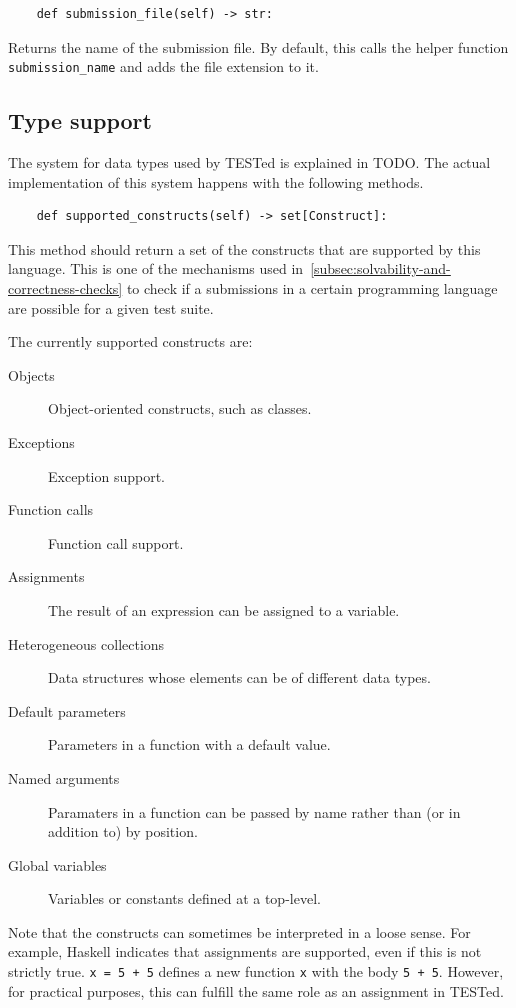 \documentclass[../main]{subfiles}
\begin{document}
\begin{verbatim}
    def submission_file(self) -> str:
\end{verbatim}

Returns the name of the submission file.
By default, this calls the helper function \texttt{submission_name} and adds the file extension to it.

\subsection{Type support}\label{subsec:type-support}

The system for data types used by TESTed is explained in TODO.
The actual implementation of this system happens with the following methods.

\begin{verbatim}
    def supported_constructs(self) -> set[Construct]:
\end{verbatim}

This method should return a set of the constructs that are supported by this language.
This is one of the mechanisms used in~\cref{subsec:solvability-and-correctness-checks} to check if a submissions in a certain programming language are possible for a given test suite.

The currently supported constructs are:

\begin{description}
    \item[Objects] Object-oriented constructs, such as classes.
    \item[Exceptions] Exception support.
    \item[Function calls] Function call support.
    \item[Assignments] The result of an expression can be assigned to a variable.
    \item[Heterogeneous collections] Data structures whose elements can be of different data types.
    \item[Default parameters] Parameters in a function with a default value.
    \item[Named arguments] Paramaters in a function can be passed by name rather than (or in addition to) by position.
    \item[Global variables] Variables or constants defined at a top-level.
\end{description}

Note that the constructs can sometimes be interpreted in a loose sense.
For example, Haskell indicates that assignments are supported, even if this is not strictly true.
\texttt{x = 5 + 5} defines a new function \texttt{x} with the body \texttt{5 + 5}.
However, for practical purposes, this can fulfill the same role as an assignment in TESTed.
\end{document}
